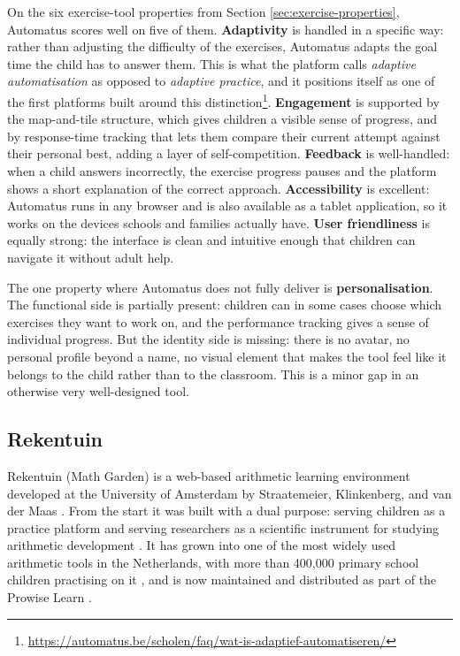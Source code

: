 On the six exercise-tool properties from Section \ref{sec:exercise-properties}, Automatus scores well on five of them. \textbf{Adaptivity} is handled in a specific way: rather than adjusting the difficulty of the exercises, Automatus adapts the goal time the child has to answer them. This is what the platform calls \textit{adaptive automatisation} as opposed to \textit{adaptive practice}, and it positions itself as one of the first platforms built around this distinction\footnote{\url{https://automatus.be/scholen/faq/wat-is-adaptief-automatiseren/}}. \textbf{Engagement} is supported by the map-and-tile structure, which gives children a visible sense of progress, and by response-time tracking that lets them compare their current attempt against their personal best, adding a layer of self-competition. \textbf{Feedback} is well-handled: when a child answers incorrectly, the exercise progress pauses and the platform shows a short explanation of the correct approach. \textbf{Accessibility} is excellent: Automatus runs in any browser and is also available as a tablet application, so it works on the devices schools and families actually have. \textbf{User friendliness} is equally strong: the interface is clean and intuitive enough that children can navigate it without adult help.

The one property where Automatus does not fully deliver is \textbf{personalisation}. The functional side is partially present: children can in some cases choose which exercises they want to work on, and the performance tracking gives a sense of individual progress. But the identity side is missing: there is no avatar, no personal profile beyond a name, no visual element that makes the tool feel like it belongs to the child rather than to the classroom. This is a minor gap in an otherwise very well-designed tool.

\subsection{Rekentuin}
Rekentuin (Math Garden) is a web-based arithmetic learning environment developed at the University of Amsterdam by Straatemeier, Klinkenberg, and van der Maas \cite{straatemeier2014mathgarden}. From the start it was built with a dual purpose: serving children as a practice platform and serving researchers as a scientific instrument for studying arithmetic development \cite{straatemeier2014mathgarden}. It has grown into one of the most widely used arithmetic tools in the Netherlands, with more than 400,000 primary school children practising on it \cite{brinkhuis2018learning}, and is now maintained and distributed as part of the Prowise Learn \cite{prowiselearn}.

